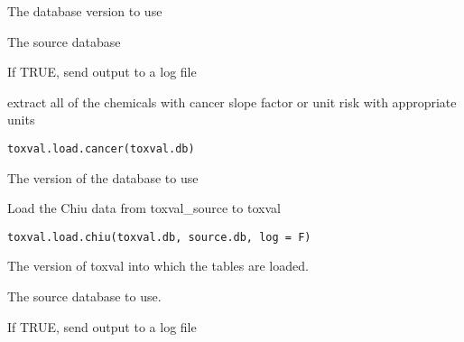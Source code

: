 \documentclass[letterpaper]{book}
\begin{document}
%
\begin{Arguments}
\begin{ldescription}
\item[\code{toxval.db}] The database version to use

\item[\code{source.db}] The source database

\item[\code{log}] If TRUE, send output to a log file
\end{ldescription}
\end{Arguments}
%
\begin{Description}\relax
extract all of the chemicals with cancer slope factor or unit risk with appropriate units
\end{Description}
%
\begin{Usage}
\begin{verbatim}
toxval.load.cancer(toxval.db)
\end{verbatim}
\end{Usage}
%
\begin{Arguments}
\begin{ldescription}
\item[\code{toxval.db}] The version of the database to use
\end{ldescription}
\end{Arguments}
%
\begin{Description}\relax
Load the Chiu data from toxval\_source to toxval
\end{Description}
%
\begin{Usage}
\begin{verbatim}
toxval.load.chiu(toxval.db, source.db, log = F)
\end{verbatim}
\end{Usage}
%
\begin{Arguments}
\begin{ldescription}
\item[\code{toxval.db}] The version of toxval into which the tables are loaded.

\item[\code{source.db}] The source database to use.

\item[\code{log}] If TRUE, send output to a log file
\end{ldescription}
\end{Arguments}
\end{document}
